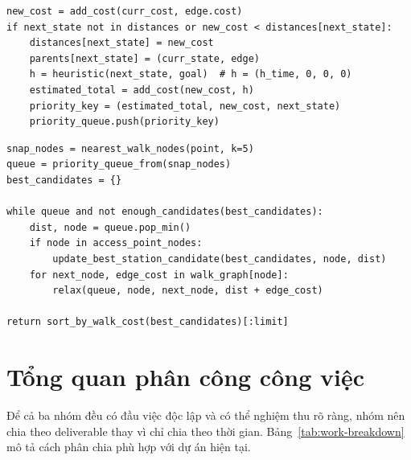 \documentclass[../DoAn.tex]{subfiles}
\begin{document}
\begin{tcolorbox}[
  enhanced,
  title={Đoạn mã 2.0: Logic cập nhật nút theo chi phí từ điển (Cost Relaxation)},
  fonttitle=\bfseries\small,
  colframe=codeframe,
  colback=codeback,
  coltitle=black,
  colbacktitle=codeheader,
  boxrule=0.5mm,
  arc=2mm,
  drop shadow,
  before=\par\vspace{8pt}\needspace{12\baselineskip},
  after=\par\vspace{10pt}
]
\begin{verbatim}
new_cost = add_cost(curr_cost, edge.cost)
if next_state not in distances or new_cost < distances[next_state]:
    distances[next_state] = new_cost
    parents[next_state] = (curr_state, edge)
    h = heuristic(next_state, goal)  # h = (h_time, 0, 0, 0)
    estimated_total = add_cost(new_cost, h)
    priority_key = (estimated_total, new_cost, next_state)
    priority_queue.push(priority_key)
\end{verbatim}
\end{tcolorbox}

\begin{tcolorbox}[
  enhanced,
  title={Đoạn mã 2.1: Logic ánh xạ toạ độ vào mạng (Walk-based Snapping)},
  fonttitle=\bfseries\small,
  colframe=codeframe,
  colback=codeback,
  coltitle=black,
  colbacktitle=codeheader,
  boxrule=0.5mm,
  arc=2mm,
  drop shadow,
  before=\par\vspace{8pt}\needspace{12\baselineskip},
  after=\par\vspace{10pt}
]
\begin{verbatim}
snap_nodes = nearest_walk_nodes(point, k=5)
queue = priority_queue_from(snap_nodes)
best_candidates = {}

while queue and not enough_candidates(best_candidates):
    dist, node = queue.pop_min()
    if node in access_point_nodes:
        update_best_station_candidate(best_candidates, node, dist)
    for next_node, edge_cost in walk_graph[node]:
        relax(queue, node, next_node, dist + edge_cost)

return sort_by_walk_cost(best_candidates)[:limit]
\end{verbatim}
\end{tcolorbox}

\section{Tổng quan phân công công việc}
Để cả ba nhóm đều có đầu việc độc lập và có thể nghiệm thu rõ ràng, nhóm nên chia theo deliverable thay vì chỉ chia theo thời gian.
Bảng~\ref{tab:work-breakdown} mô tả cách phân chia phù hợp với dự án hiện tại.
\end{document}

